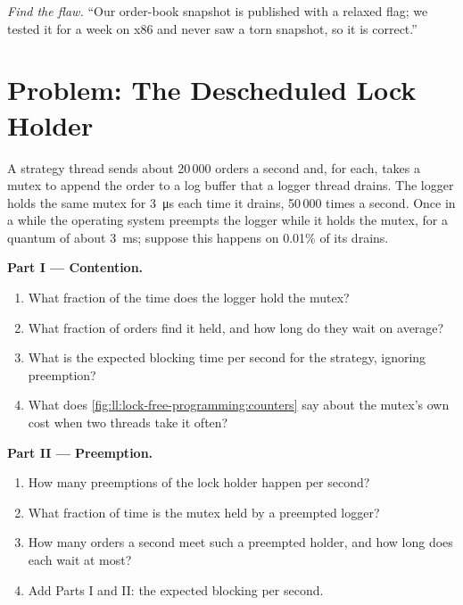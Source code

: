 \begin{exercise}[$\star\star\star$]\label{exo:ll:lock-free-programming:8}
\emph{Find the flaw.} ``Our order-book snapshot is published with a relaxed flag; we tested it for a week on x86 and never saw a
torn snapshot, so it is correct.''
\end{exercise}

\section{Problem: The Descheduled Lock Holder}

\begin{problem}\label{pb:ll:lock-free-programming:1}
A strategy thread sends about 20\,000 orders a second and, for each, takes a mutex to append the order to a log buffer that a
logger thread drains. The logger holds the same mutex for \qty{3}{\micro\second} each time it drains, 50\,000 times a second.
Once in a while the operating system preempts the logger while it holds the mutex, for a quantum of about
\qty{3}{\milli\second}; suppose this happens on 0.01\% of its drains.

\medskip\noindent\textbf{Part I --- Contention.}
\begin{enumerate}
\item What fraction of the time does the logger hold the mutex?
\item What fraction of orders find it held, and how long do they wait on average?
\item What is the expected blocking time per second for the strategy, ignoring preemption?
\item What does \cref{fig:ll:lock-free-programming:counters} say about the mutex's own cost when two threads take it often?
\end{enumerate}

\medskip\noindent\textbf{Part II --- Preemption.}
\begin{enumerate}[resume]
\item How many preemptions of the lock holder happen per second?
\item What fraction of time is the mutex held by a preempted logger?
\item How many orders a second meet such a preempted holder, and how long does each wait at most?
\item Add Parts I and II: the expected blocking per second.
\end{enumerate}


\end{problem}
